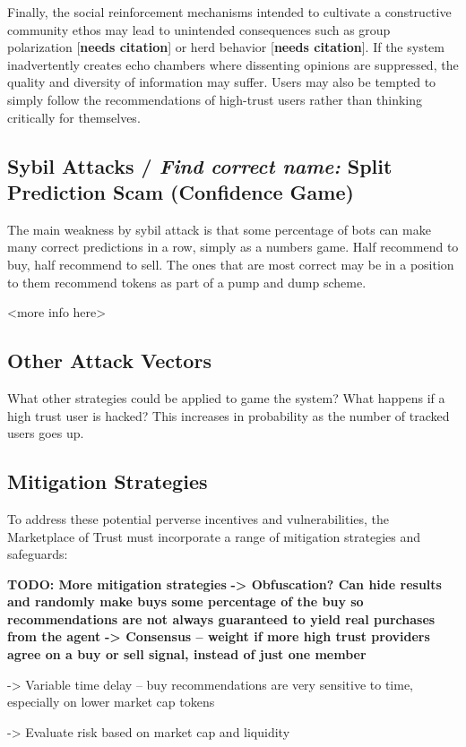 \documentclass{article}
\begin{document}
Finally, the social reinforcement mechanisms intended to cultivate a constructive community ethos may lead to unintended consequences such as group polarization [\textbf{needs citation}] or herd behavior [\textbf{needs citation}]. If the system inadvertently creates echo chambers where dissenting opinions are suppressed, the quality and diversity of information may suffer. Users may also be tempted to simply follow the recommendations of high-trust users rather than thinking critically for themselves.  

\subsection{Sybil Attacks / \textit{Find correct name: }Split Prediction Scam (Confidence Game)
}
The main weakness by sybil attack is that some percentage of bots can make many correct predictions in a row, simply as a numbers game. Half recommend to buy, half recommend to sell. The ones that are most correct may be in a position to them recommend tokens as part of a pump and dump scheme.

<more info here>

\subsection{Other Attack Vectors}
What other strategies could be applied to game the system?
What happens if a high trust user is hacked? This increases in probability as the number of tracked users goes up.

\subsection{Mitigation Strategies}
To address these potential perverse incentives and vulnerabilities, the Marketplace of Trust must incorporate a range of mitigation strategies and safeguards:

\textbf{TODO: More mitigation strategies
}
\textbf{-> Obfuscation? Can hide results and randomly make buys some percentage of the buy so recommendations are not always guaranteed to yield real purchases from the agent
}
\textbf{-> Consensus -- weight if more high trust providers agree on a buy or sell signal, instead of just one member}

-> Variable time delay -- buy recommendations are very sensitive to time, especially on lower market cap tokens

-> Evaluate risk based on market cap and liquidity
\end{document}
